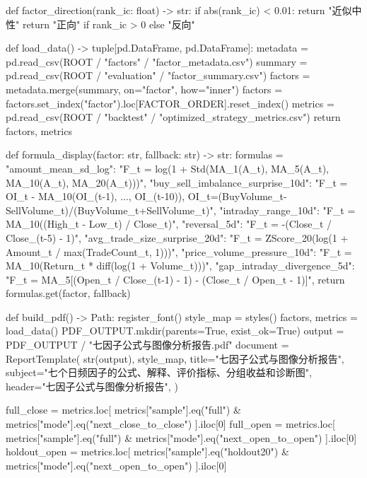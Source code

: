 \documentclass[UTF8,a4paper,fontset=fandol]{ctexart}
\begin{document}
\begin{ProjectCode}
def factor_direction(rank_ic: float) -> str:
    if abs(rank_ic) < 0.01:
        return "近似中性"
    return "正向" if rank_ic > 0 else "反向"


def load_data() -> tuple[pd.DataFrame, pd.DataFrame]:
    metadata = pd.read_csv(ROOT / "factors" / "factor_metadata.csv")
    summary = pd.read_csv(ROOT / "evaluation" / "factor_summary.csv")
    factors = metadata.merge(summary, on="factor", how="inner")
    factors = factors.set_index("factor").loc[FACTOR_ORDER].reset_index()
    metrics = pd.read_csv(ROOT / "backtest" / "optimized_strategy_metrics.csv")
    return factors, metrics


def formula_display(factor: str, fallback: str) -> str:
    formulas = {
        "amount_mean_sd_log": "F_t = log(1 + Std(MA_1(A_t), MA_5(A_t), MA_10(A_t), MA_20(A_t)))",
        "buy_sell_imbalance_surprise_10d": "F_t = OI_t - MA_10(OI_(t-1), ..., OI_(t-10)), OI_t=(BuyVolume_t-SellVolume_t)/(BuyVolume_t+SellVolume_t)",
        "intraday_range_10d": "F_t = MA_10((High_t - Low_t) / Close_t)",
        "reversal_5d": "F_t = -(Close_t / Close_(t-5) - 1)",
        "avg_trade_size_surprise_20d": "F_t = ZScore_20(log(1 + Amount_t / max(TradeCount_t, 1)))",
        "price_volume_pressure_10d": "F_t = MA_10(Return_t * diff(log(1 + Volume_t)))",
        "gap_intraday_divergence_5d": "F_t = MA_5[(Open_t / Close_(t-1) - 1) - (Close_t / Open_t - 1)]",
    }
    return formulas.get(factor, fallback)


def build_pdf() -> Path:
    register_font()
    style_map = styles()
    factors, metrics = load_data()
    PDF_OUTPUT.mkdir(parents=True, exist_ok=True)
    output = PDF_OUTPUT / "七因子公式与图像分析报告.pdf"
    document = ReportTemplate(
        str(output),
        style_map,
        title="七因子公式与图像分析报告",
        subject="七个日频因子的公式、解释、评价指标、分组收益和诊断图",
        header="七因子公式与图像分析报告",
    )

    full_close = metrics.loc[
        metrics["sample"].eq("full") & metrics["mode"].eq("next_close_to_close")
    ].iloc[0]
    full_open = metrics.loc[
        metrics["sample"].eq("full") & metrics["mode"].eq("next_open_to_open")
    ].iloc[0]
    holdout_open = metrics.loc[
        metrics["sample"].eq("holdout20") & metrics["mode"].eq("next_open_to_open")
    ].iloc[0]


\end{ProjectCode}
\end{document}
